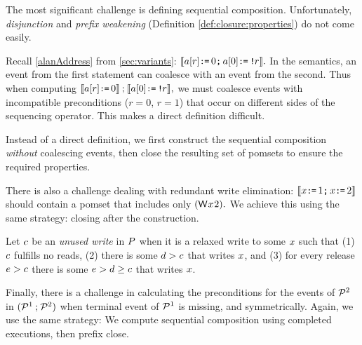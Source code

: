 The most significant challenge is defining sequential composition.
Unfortunately, \emph{disjunction} and \emph{prefix weakening} (Definition
\ref{def:closure:properties}) do not come easily.

Recall \eqref{alanAddress} from \textsection\ref{sec:variants}:
\begin{math}
  \llbracket a[r] \texttt{:}\mkern-1mu\texttt{=}\, 0\texttt{;}\,\allowbreak a[0]\texttt{:}\mkern-1mu\texttt{=}\, \texttt{!}\mkern-1mu r\rrbracket.
\end{math}
In the semantics, an event from the first statement can coalesce with an
event from the second.  Thus when computing
\begin{math}
  \llbracket a[r] \texttt{:}\mkern-1mu\texttt{=}\, 0\rrbracket \mathbin; \llbracket a[0]\texttt{:}\mkern-1mu\texttt{=}\, \texttt{!}\mkern-1mu r\rrbracket,
\end{math}
we must coalesce events with incompatible preconditions ($r{=}0$, $r{=}1$)
that occur on different sides of the sequencing operator.  This makes a
direct definition difficult.

Instead of a direct definition, we first construct the sequential composition
\emph{without} coalescing events, then close the resulting set of pomsets to
ensure the required properties.

There is also a challenge dealing with redundant write elimination:
\begin{math}
  \llbracket x\texttt{:}\mkern-1mu\texttt{=}\, 1\texttt{;}\,\allowbreak x\texttt{:}\mkern-1mu\texttt{=}\, 2\rrbracket 
\end{math}
should contain a pomset that includes only
\begin{math}
  (\DW{x}{2}).
\end{math}
We achieve this using the same strategy: closing after the construction.

Let $c$ be an \emph{unused write} in $P$ when it is a relaxed write to
some $x$ such that (1) $c$ fulfills no reads, (2) there is some
$d>c$ that writes $x$, and (3) for every release $e>c$
there is some $e>d\ge c$ that writes $x$.

Finally, there is a challenge in calculating the preconditions for the events
of $\mathcal{P}^2$ in $(\mathcal{P}^1\mathbin;\mathcal{P}^2)$ when terminal event of $\mathcal{P}^1$ is
missing, and symmetrically.  Again, we use the same strategy: We compute
sequential composition using completed executions, then prefix close.

